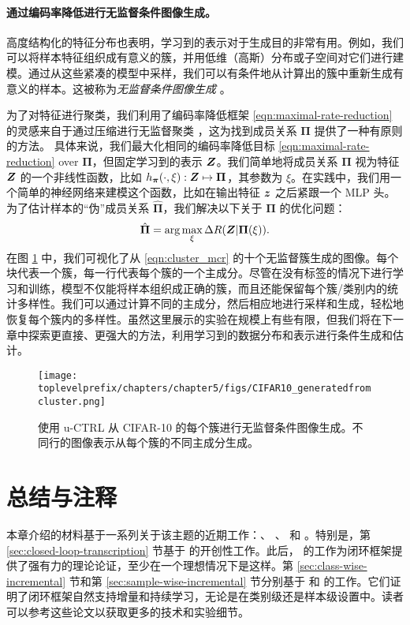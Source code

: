 \documentclass[../../book-main_zh.tex]{subfiles}
\begin{document}
\paragraph{通过编码率降低进行无监督条件图像生成。}
高度结构化的特征分布也表明，学习到的表示对于生成目的非常有用。例如，我们可以将样本特征组织成有意义的簇，并用低维（高斯）分布或子空间对它们进行建模。通过从这些紧凑的模型中采样，我们可以有条件地从计算出的簇中重新生成有意义的样本。这被称为{\em 无监督条件图像生成} \cite{hwang2021stein}。

为了对特征进行聚类，我们利用了编码率降低框架 \eqref{eqn:maximal-rate-reduction} 的灵感来自于通过压缩进行无监督聚类 \cite{ma2007segmentation}，这为找到成员关系 $\bm \Pi$ 提供了一种有原则的方法。
具体来说，我们最大化相同的编码率降低目标 \eqref{eqn:maximal-rate-reduction} over $\bm \Pi$，但固定学习到的表示 $\bm{Z}$。我们简单地将成员关系 $\bm \Pi$ 视为特征 $\bm{Z}$ 的一个非线性函数，比如 $h_{\bm \pi}(\cdot,\xi):\bm{Z} \mapsto \bm \Pi$，其参数为 $\xi$。在实践中，我们用一个简单的神经网络来建模这个函数，比如在输出特征 $\bm{z}$ 之后紧跟一个 MLP 头。
为了估计样本的“伪”成员关系 $\hat{\bm \Pi}$，我们解决以下关于 $\bm \Pi$ 的优化问题：
\begin{align}
    \hat{\bm \Pi} = \arg\max_{\xi} \Delta R(\bm{Z}| \bm \Pi(\xi)).
\label{eqn:cluster_mcr}
\end{align}
在图 \ref{fig:vis_clustering} 中，我们可视化了从 \eqref{eqn:cluster_mcr} 的十个无监督簇生成的图像。每个块代表一个簇，每一行代表每个簇的一个主成分。尽管在没有标签的情况下进行学习和训练，模型不仅能将样本组织成正确的簇，而且还能保留每个簇/类别内的统计多样性。我们可以通过计算不同的主成分，然后相应地进行采样和生成，轻松地恢复每个簇内的多样性。虽然这里展示的实验在规模上有些有限，但我们将在下一章中探索更直接、更强大的方法，利用学习到的数据分布和表示进行条件生成和估计。
\begin{figure}[t]
    \footnotesize
    \centering
    \texttt{[image: \\toplevelprefix/chapters/chapter5/figs/CIFAR10\_generatedfromcluster.png]}
    \caption{\small 使用 u-CTRL 从 CIFAR-10 的每个簇进行无监督条件图像生成。不同行的图像表示从每个簇的不同主成分生成。}
    \label{fig:vis_clustering}
\end{figure}





\section{总结与注释}
本章介绍的材料基于一系列关于该主题的近期工作：\cite{Dai-entropy-2022}、
\cite{pai2022pursuit}、\cite{tong2023incremental} 和 \cite{pmlr-v234-tong24a}。特别是，第 \ref{sec:closed-loop-transcription} 节基于 \cite{Dai-entropy-2022} 的开创性工作。此后，\cite{pai2022pursuit} 的工作为闭环框架提供了强有力的理论论证，至少在一个理想情况下是这样。第 \ref{sec:class-wise-incremental} 节和第 \ref{sec:sample-wise-incremental} 节分别基于 \cite{tong2023incremental} 和 \cite{pmlr-v234-tong24a} 的工作。它们证明了闭环框架自然支持增量和持续学习，无论是在类别级还是样本级设置中。读者可以参考这些论文以获取更多的技术和实验细节。
\end{document}
